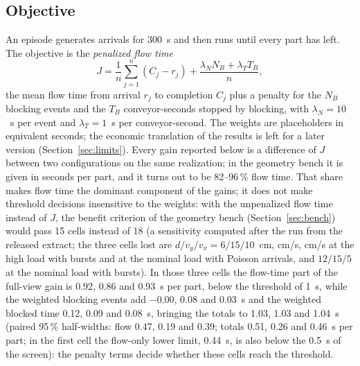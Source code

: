 \documentclass[11pt,a4paper]{article}
\begin{document}
\subsection{Objective}
An episode generates arrivals for 300~s and then runs until every part has left. The
objective is the \emph{penalized flow time}
\begin{equation}
J=\frac{1}{n}\sum_{j=1}^{n}(C_j-r_j)+\frac{\lambda_N N_B+\lambda_T T_B}{n},
\end{equation}
the mean flow time from arrival $r_j$ to completion $C_j$ plus a penalty for the $N_B$
blocking events and the $T_B$ conveyor-seconds stopped by blocking, with $\lambda_N=10$~s
per event and $\lambda_T=1$~s per conveyor-second. The weights are placeholders in
equivalent seconds; the economic translation of the results is left for a later version
(Section~\ref{sec:limits}). Every gain reported below is a difference of $J$ between two
configurations on the same realization; in the geometry bench it is given in seconds per
part, and it turns out to be 82--96\,\% flow time. That share makes flow time the dominant
component of the gains; it does not make threshold decisions insensitive to the weights:
with the unpenalized flow time instead of $J$, the benefit criterion of the geometry bench
(Section~\ref{sec:bench}) would pass 15 cells instead of 18 (a sensitivity computed after
the run from the released extract; the three cells lost are $d/v_y/v_x=6/15/10$~cm,
cm/s, cm/s at the high load with bursts and at the nominal load with Poisson arrivals,
and $12/15/5$ at the nominal load with bursts). In those three cells the flow-time part of
the full-view gain is 0.92, 0.86 and 0.93~s per part, below the threshold of 1~s, while the
weighted blocking events add $-0.00$, 0.08 and 0.03~s and the weighted blocked time 0.12,
0.09 and 0.08~s, bringing the totals to 1.03, 1.03 and 1.04~s (paired 95\,\% half-widths:
flow 0.47, 0.19 and 0.39; totals 0.51, 0.26 and 0.46~s per part; in the first cell the
flow-only lower limit, 0.44~s, is also below the 0.5~s of the screen): the penalty terms
decide whether these cells reach the threshold.
\end{document}
